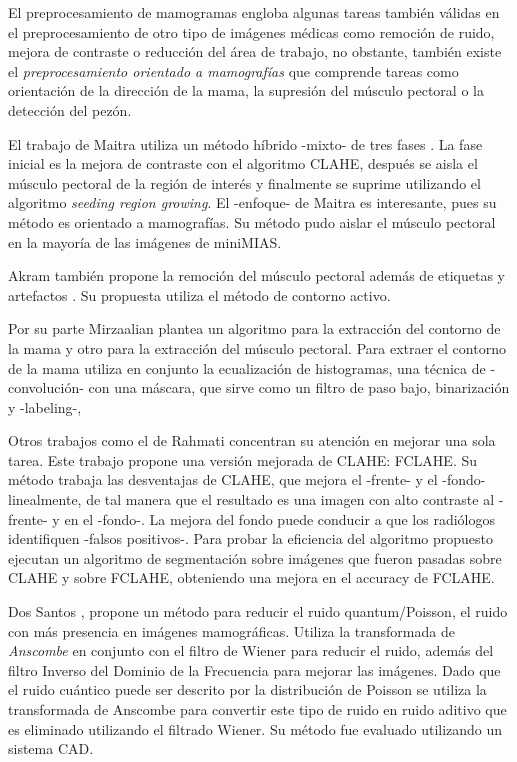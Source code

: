 El preprocesamiento de mamogramas engloba algunas tareas también válidas en
el preprocesamiento de otro tipo de imágenes médicas como remoción de ruido,
mejora de contraste o reducción del área de trabajo, no obstante, también
existe el \textit{preprocesamiento orientado a mamografías} que comprende
tareas como orientación de la dirección de la mama, la supresión del músculo
pectoral o la detección del pezón.


El trabajo de Maitra utiliza un método híbrido -mixto- de tres fases
\cite{maitra2012technique}. La fase inicial es la mejora de contraste con el
algoritmo CLAHE, después se aisla el músculo pectoral de la región de interés y
finalmente se suprime utilizando el algoritmo \textit{seeding region growing}.
El -enfoque- de Maitra es interesante, pues su método es orientado a
mamografías. Su método pudo aislar el músculo pectoral en la mayoría de las
imágenes de miniMIAS.

Akram también propone la remoción del músculo pectoral además de etiquetas y
artefactos \cite{akram2013preprocessing}. Su propuesta utiliza el método de
contorno activo. 

Por su parte Mirzaalian \cite{mirzaalian2007pre} plantea un algoritmo para la
extracción del contorno de la mama y otro para la extracción del músculo
pectoral. Para extraer el contorno de la mama utiliza en conjunto la
ecualización de histogramas, una técnica de -convolución- con una máscara, que
sirve como un filtro de paso bajo, binarización y -labeling-, 

Otros trabajos como el de Rahmati \cite{rahmati2010new} concentran su atención en
mejorar una sola tarea. Este trabajo propone una versión mejorada de CLAHE:
FCLAHE. Su método trabaja las desventajas de CLAHE, que mejora el -frente- y el
-fondo- linealmente, de tal manera que el resultado es una imagen con alto
contraste al -frente- y en el -fondo-. La mejora del fondo puede conducir a que
los radiólogos identifiquen -falsos positivos-. Para probar la eficiencia del
algoritmo propuesto ejecutan un algoritmo de segmentación sobre imágenes que
fueron pasadas sobre CLAHE y sobre FCLAHE, obteniendo una mejora en el accuracy
de FCLAHE.


Dos Santos \cite{romualdopre}, \cite{dos2009mammography} propone un método para
reducir el ruido quantum/Poisson, el ruido con más presencia en imágenes mamográficas.
Utiliza la transformada de \textit{Anscombe} en conjunto con el filtro de
Wiener para reducir el ruido, además del filtro Inverso del Dominio de la
Frecuencia para mejorar las imágenes. Dado que el ruido cuántico puede ser
descrito por la distribución de Poisson se utiliza la transformada de Anscombe
para convertir este tipo de ruido en ruido aditivo que es eliminado utilizando
el filtrado Wiener. Su método fue evaluado utilizando un sistema CAD. 

